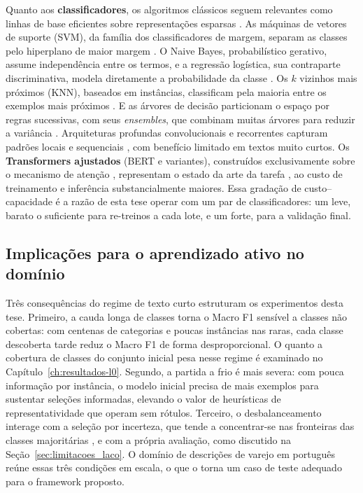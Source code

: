 Quanto aos \textbf{classificadores}, os algoritmos clássicos seguem
relevantes como linhas de base eficientes sobre representações esparsas
\cite{Kowsari2019, Aliero2023}. As máquinas de vetores de
suporte (SVM), da família dos classificadores de margem, separam as
classes pelo hiperplano de maior margem \cite{Cortes1995}. O Naive Bayes,
probabilístico gerativo, assume independência entre os termos, e a
regressão logística, sua contraparte discriminativa, modela diretamente a
probabilidade da classe \cite{Murphy2012}. Os $k$ vizinhos mais próximos
(KNN), baseados em instâncias, classificam pela maioria entre os exemplos
mais próximos \cite{Cover1967}. E as árvores de decisão particionam o
espaço por regras sucessivas, com seus \textit{ensembles}, que combinam
muitas árvores para reduzir a variância \cite{Quinlan1993,
Breiman2001, Dietterich2000}.
Arquiteturas profundas convolucionais e recorrentes capturam padrões locais e
sequenciais \cite{Goodfellow2016, Xu2017}, com benefício limitado em textos
muito curtos. Os \textbf{Transformers ajustados} (BERT e variantes),
construídos exclusivamente sobre o mecanismo de atenção \citep{Vaswani2017},
representam o estado da arte da tarefa \cite{Devlin2019, Li2020, Karl2023},
ao custo de treinamento e inferência substancialmente maiores. Essa gradação
de custo--capacidade é a razão de esta tese operar com um par de
classificadores: um leve, barato o suficiente para re-treinos a cada lote, e
um forte, para a validação final.

\subsection{Implicações para o aprendizado ativo no domínio}
\label{subsec:stc_implicacoes}

Três consequências do regime de texto curto estruturam os experimentos desta
tese. Primeiro, a cauda longa de classes torna o Macro F1 sensível a classes não cobertas: com
centenas de categorias e poucas instâncias nas raras, cada classe descoberta
tarde reduz o Macro F1 de forma desproporcional. O quanto a cobertura de
classes do conjunto inicial pesa nesse regime é examinado no
Capítulo~\ref{ch:resultados-l0}. Segundo, a partida a frio é mais severa: com
pouca informação por instância, o modelo inicial precisa de mais exemplos para
sustentar seleções informadas, elevando o valor de heurísticas de
representatividade que operam sem rótulos. Terceiro, o desbalanceamento
interage com a seleção por incerteza, que tende a concentrar-se nas
fronteiras das classes majoritárias \cite{Attenberg2010}, e com a própria
avaliação, como discutido na Seção~\ref{sec:limitacoes_laco}. O domínio de
descrições de varejo em português \cite{Daru2022} reúne essas três condições
em escala, o que o torna um caso de teste adequado para o framework proposto.

